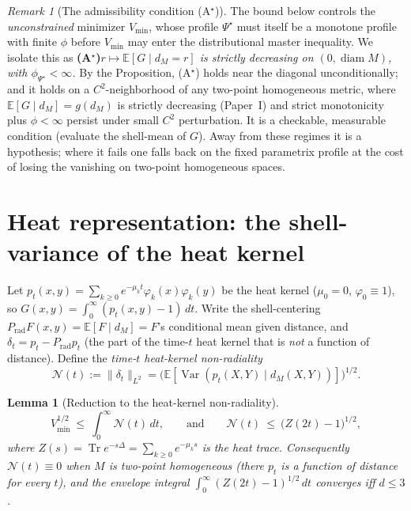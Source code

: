 \documentclass[11pt]{article}
\newtheorem{lemma}[theorem]{Lemma}
\theoremstyle{remark}
\newtheorem{remark}[theorem]{Remark}
\newcommand{\diam}{\operatorname{diam}}
\newcommand{\dM}{d_M}
\newcommand{\Var}{\operatorname{Var}}
\newcommand{\E}{\mathbb E}
\DeclareMathOperator{\Tr}{Tr}
\begin{document}
\begin{remark}[The admissibility condition (A$^\star$)]\label{rem:astar}
The bound below controls the \emph{unconstrained} minimizer $V_{\min}$, whose profile
$\Psi^\star$ must itself be a monotone profile with finite $\phi$ before $V_{\min}$ may enter
the distributional master inequality. We isolate this as
\smallskip
\noindent\textbf{(A$^\star$)}\quad \emph{$r\mapsto\E[G\mid\dM=r]$ is strictly decreasing on
$(0,\diam M)$, with $\phi_{\Psi^\star}<\infty$.}
\smallskip
By the Proposition, (A$^\star$) holds near the diagonal unconditionally; and it holds on a
$C^2$-neighborhood of any two-point homogeneous metric, where $\E[G\mid\dM]=g(\dM)$ is
strictly decreasing (Paper~I) and strict monotonicity plus $\phi<\infty$ persist under small
$C^2$ perturbation. It is a checkable, measurable condition (evaluate the shell-mean of $G$).
Away from these regimes it is a hypothesis; where it fails one falls back on the fixed
parametrix profile at the cost of losing the vanishing on two-point homogeneous spaces.
\end{remark}

\section{Heat representation: the shell-variance of the heat kernel}

Let $p_t(x,y)=\sum_{k\ge0}e^{-\mu_k t}\varphi_k(x)\varphi_k(y)$ be the heat kernel
($\mu_0=0$, $\varphi_0\equiv1$), so $G(x,y)=\int_0^\infty(p_t(x,y)-1)\,dt$. Write the
shell-centering $P_{\mathrm{rad}}F(x,y)=\E[F\mid\dM]=F$'s conditional mean given distance,
and $\delta_t=p_t-P_{\mathrm{rad}}p_t$ (the part of the time-$t$ heat kernel that is
\emph{not} a function of distance). Define the \emph{time-$t$ heat-kernel non-radiality}
\[
\mathcal N(t):=\lVert\delta_t\rVert_{L^2}=\bigl(\E[\Var(p_t(X,Y)\mid\dM(X,Y))]\bigr)^{1/2}.
\]

\begin{lemma}[Reduction to the heat-kernel non-radiality]\label{lem:reduce}
\[
V_{\min}^{1/2}\ \le\ \int_0^\infty\mathcal N(t)\,dt,
\qquad\text{and}\qquad
\mathcal N(t)\ \le\ \bigl(Z(2t)-1\bigr)^{1/2},
\]
where $Z(s)=\Tr e^{-s\Delta}=\sum_{k\ge0}e^{-\mu_k s}$ is the heat trace. Consequently
$\mathcal N(t)\equiv0$ when $M$ is two-point homogeneous (there $p_t$ is a function of
distance for every $t$), and the envelope integral $\int_0^\infty(Z(2t)-1)^{1/2}\,dt$
converges \emph{iff} $d\le3$.
\end{lemma}
\end{document}
